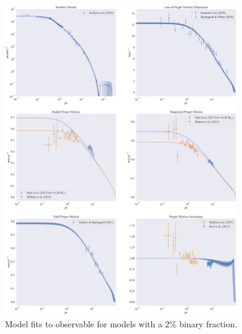 \begin{figure}
	\centering
	\includegraphics[width=0.9\textwidth]{figures/low_bin_model/obs_panel.png}
	\caption{Model fits to observable for models with a $2\%$ binary fraction.}
	\label{fig:low_bin_model_obs_panel}
\end{figure}


